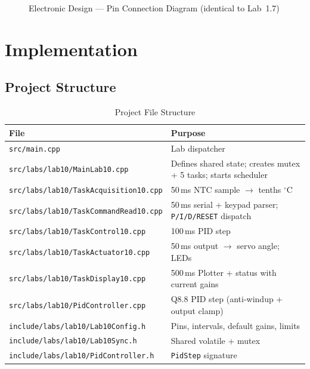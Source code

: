\documentclass[12pt]{article}
\begin{document}
\begin{figure}[H]
\caption{Electronic Design --- Pin Connection Diagram (identical to Lab~1.7)}
\label{fig:elec}
\end{figure}

\section{Implementation}

\subsection{Project Structure}

\begin{table}[H]
\centering
\begin{tabular}{@{}lp{8.0cm}@{}}
\toprule
\textbf{File} & \textbf{Purpose} \\
\midrule
\texttt{src/main.cpp}                        & Lab dispatcher \\
\texttt{src/labs/lab10/MainLab10.cpp}        & Defines shared state; creates mutex + 5 tasks; starts scheduler \\
\texttt{src/labs/lab10/TaskAcquisition10.cpp}& 50\,ms NTC sample $\to$ tenths $^{\circ}$C \\
\texttt{src/labs/lab10/TaskCommandRead10.cpp}& 50\,ms serial + keypad parser; \texttt{P/I/D/RESET} dispatch \\
\texttt{src/labs/lab10/TaskControl10.cpp}    & 100\,ms PID step \\
\texttt{src/labs/lab10/TaskActuator10.cpp}   & 50\,ms output $\to$ servo angle; LEDs \\
\texttt{src/labs/lab10/TaskDisplay10.cpp}    & 500\,ms Plotter + status with current gains \\
\texttt{src/labs/lab10/PidController.cpp}    & Q8.8 PID step (anti-windup + output clamp) \\
\texttt{include/labs/lab10/Lab10Config.h}    & Pins, intervals, default gains, limits \\
\texttt{include/labs/lab10/Lab10Sync.h}      & Shared volatile + mutex \\
\texttt{include/labs/lab10/PidController.h}  & \texttt{PidStep} signature \\
\bottomrule
\end{tabular}
\caption{Project File Structure}
\label{tab:files}
\end{table}
\end{document}
